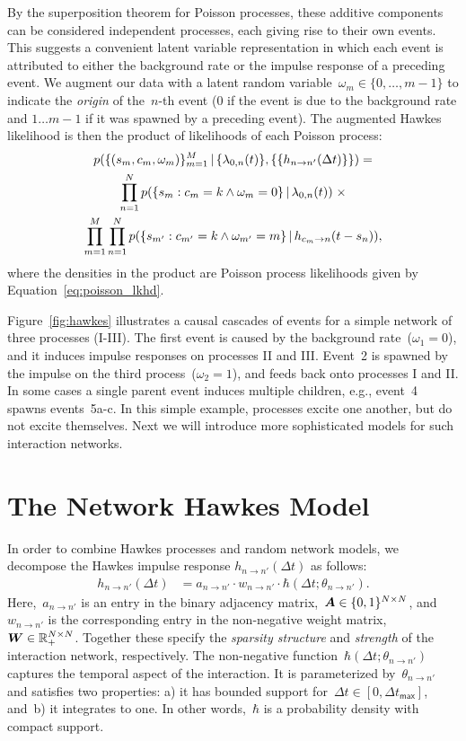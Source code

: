 By the superposition theorem for Poisson processes, these additive
components can be considered independent processes, each giving rise
to their own events.  This suggests a convenient latent variable
representation in which each event is attributed to either the
background rate or the impulse response of a preceding event.  We
augment our data with a latent random
variable~${\omega_m \in\{0,\ldots, m-1\}}$ to indicate the \emph{origin} of
the~$n$-th event ($0$ if the event is due to the background rate and
${1\ldots m-1}$ if it was spawned by a preceding event). The augmented
Hawkes likelihood is then the product of likelihoods of each Poisson
process:
\begin{multline*}
p(\{(s_m,c_m,\omega_m)\}_{m=1}^M \,|\, \{\lambda_{0,n}(t)\}, \{\{h_{n \to n'}(\Delta t)\}\}) = \\
\prod_{n=1}^N p(\{s_{m}: c_{m}=k \wedge \omega_{m}=0\} \,|\, \lambda_{0,n}(t))\;\times\\
\prod_{m=1}^M \prod_{n=1}^N p(\{s_{m'}: c_{m'}=k \wedge \omega_{m'}=m\} \,|\, h_{c_m \to n}(t-s_n)),
\end{multline*}
where the densities in the product are Poisson process likelihoods
given by Equation~\ref{eq:poisson_lkhd}.

Figure~\ref{fig:hawkes} illustrates a causal cascades of events for a
simple network of three processes (I-III).  The first event is caused
by the background rate~(${\omega_1=0}$), and it induces impulse responses
on processes II and III. Event~2 is spawned by the impulse on the
third process~(${\omega_2=1}$), and feeds back onto processes I and II. In
some cases a single parent event induces multiple children, e.g.,
event~4 spawns events~{5a-c}. In this simple example, processes excite
one another, but do not excite themselves. Next we will introduce more
sophisticated models for such interaction networks.

\section{The Network Hawkes Model}\label{sec:basic_model}
In order to combine Hawkes processes and random network models, we
decompose the Hawkes impulse response $h_{n \to n'}(\Delta t)$ as
follows:
\begin{align}
\label{eq:ir_decomp}
h_{n \to n'}(\Delta t) &= a_{n \to n'} \cdot w_{n \to n'} \cdot \hbar(\Delta t; \theta_{n \to n'}).
\end{align}
Here,~$a_{n \to n'}$ is an entry in the binary adjacency
matrix,~${\boldsymbol{A}\in\{0,1\}^{N \times N}}$,
and~$w_{n \to n'}$ is the corresponding entry in the non-negative
weight matrix,~${\boldsymbol{W} \in\mathbb{R}_+^{N\times N}}$. Together these specify
the \emph{sparsity structure} and \emph{strength} of the interaction
network, respectively. The non-negative function~${\hbar(\Delta t;
  \theta_{n \to n'})}$ captures the temporal aspect of the
interaction. It is parameterized by~${\theta_{n \to n'}}$ and
satisfies two properties: a) it has bounded support for~${\Delta t \in
  [0,\Delta t_{\mathsf{max}}]}$, and~b) it integrates to one. In other
words,~$\hbar$ is a probability density with compact support.

